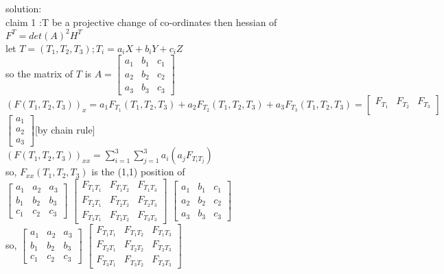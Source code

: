 \documentclass[11pt]{article}
\begin{document}
solution:\\
claim 1 :T be a projective change of co-ordinates then hessian of $F^{T}=det(A)^2 H^T $ \\
let $T=(T_1,T_2,T_3);T_i=a_iX+b_iY+c_iZ$\\
so the matrix of $T$ is $A=\begin{bmatrix}
a_1 & b_1 & c_1\\
a_2 & b_2 & c_2\\
a_3 & b_3 & c_3
\end{bmatrix}$\\
$(F(T_1,T_2,T_3))_{x}=a_1F_{T_1}(T_1,T_2,T_3)+a_2F_{T_2}(T_1,T_2,T_3)+a_3F_{T_3}(T_1,T_2,T_3)=\begin{bmatrix}
 F_{T_1} & F_{T_2} & F_{T_3}\\
\end{bmatrix}$
$\begin{bmatrix}
a_1 \\
a_2 \\
a_3
\end{bmatrix} $[by chain rule]\\
$(F(T_1,T_2,T_3))_{xx}=\sum_{i=1}^3\sum_{j=1}^3a_i(a_j F_{T_iT_j})$\\
so, $F_{xx}(T_1,T_2,T_3)$ is the (1,1) position of \\
$\begin{bmatrix}
a_1 & a_2 & a_3\\
b_1 & b_2 & b_3\\
c_1 & c_2 & c_3
\end{bmatrix}$
$\begin{bmatrix}
F_{T_1T_1} & F_{T_1T_2} & F_{T_1T_3}\\
F_{T_2T_1} & F_{T_2T_2} & F_{T_2T_3}\\
F_{T_3T_1} & F_{T_3T_2} & F_{T_3T_3}
\end{bmatrix}$
$\begin{bmatrix}
a_1 & b_1 & c_1\\
a_2 & b_2 & c_2\\
a_3 & b_3 & c_3
\end{bmatrix}$\\
so, $\begin{bmatrix}
a_1 & a_2 & a_3\\
b_1 & b_2 & b_3\\
c_1 & c_2 & c_3
\end{bmatrix}$
$\begin{bmatrix}
F_{T_1T_1} & F_{T_1T_2} & F_{T_1T_3}\\
F_{T_2T_1} & F_{T_2T_2} & F_{T_2T_3}\\
F_{T_3T_1} & F_{T_3T_2} & F_{T_3T_3}
\end{bmatrix}$
\end{document}
